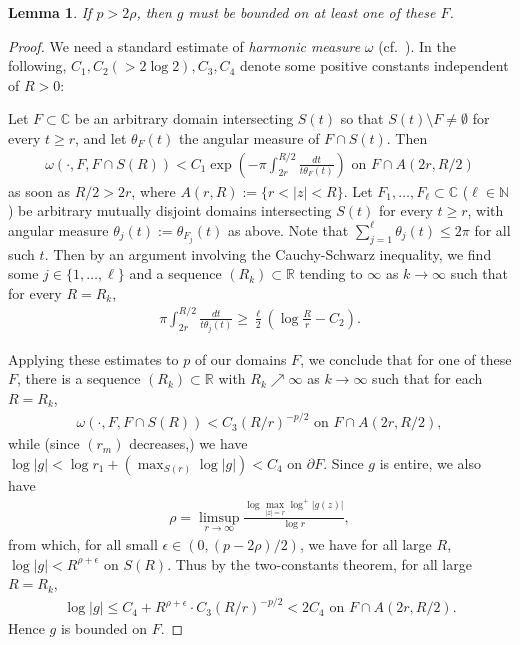 \documentclass[a4paper,12pt]{amsart}
\theoremstyle{plain}
\newtheorem{lemma}[equation]{Lemma}
\theoremstyle{definition}
\theoremstyle{remark}
\numberwithin{equation}{section}
\begin{document}
\begin{lemma}\label{th:setF}
 If $p>2\rho$, then $g$ must be bounded on at least one of these $F$.
\end{lemma}

\begin{proof}
We need a standard estimate of {\itshape harmonic measure} $\omega$
(cf.\ \cite[XI. \S 4]{Nevan70}).
In the following,
$C_1,C_2(>2\log 2),C_3,C_4$ denote some positive constants independent of $R>0$:

Let $F\subset{\mathbb{C}}$ be an arbitrary domain intersecting $S(t)$ 
so that $S(t)\setminus F\neq \emptyset$ for every $t\ge r$,
and let $\theta_F(t)$ the angular measure of $F\cap S(t)$. Then
 \begin{gather*}
  \omega(\cdot,F,F\cap S(R))<C_1\exp\left(-\pi\int_{2r}^{R/2}\frac{{\mathit{d}} t}{t\theta_F(t)}\right)\text{ on } F\cap A(2r,R/2)\label{eq:tsuji}
 \end{gather*}
as soon as $R/2>2r$, where $A(r,R):=\{r<|z|<R\}$. Let $F_1,\ldots, F_\ell\subset{\mathbb{C}}$
($\ell\in{\mathbb{N}}$) be arbitrary mutually disjoint domains intersecting $S(t)$
for every $t\ge r$, with angular measure $\theta_j(t):=\theta_{F_j}(t)$ as above.
Note that $\sum_{j=1}^{\ell}\theta_j(t)\le 2\pi$ for all such $t$.
Then by an argument involving the Cauchy-Schwarz inequality,
we find some $j\in\{1,\ldots,\ell\}$
and a sequence $(R_k)\subset{\mathbb{R}}$ tending to $\infty$ as $k\to\infty$
such that for every $R=R_k$,
\begin{gather*}
 \pi\int_{2r}^{R/2}\frac{{\mathit{d}} t}{t\theta_j(t)}\ge
 \frac{\ell}{2}\left(\log\frac{R}{r}-C_2\right).\label{eq:harm}
\end{gather*}

Applying these estimates to $p$ of our domains $F$,
we conclude that for one of these $F$, 
there is a sequence $(R_k)\subset{\mathbb{R}}$ with $R_k\nearrow\infty$ as $k\to\infty$
such that for each $R=R_k$,
\begin{gather*}
 \omega(\cdot,F,F\cap S(R))<C_3(R/r)^{-p/2}\text{ on }F\cap A(2r,R/2),
\end{gather*}
while (since $(r_m)$ decreases,) 
we have $\log |g|<\log r_1+(\max_{S(r)}\log|g|)<C_4$ on $\partial F$.
Since $g$ is entire, we also have
\begin{gather*}
 \rho=\limsup_{r\to\infty}\frac{\log\max_{|z|=r}\log^+|g(z)|}{\log r},\label{eq:orderentire}
\end{gather*}
from which, for all small $\epsilon\in(0,(p-2\rho)/2)$,
we have for all large $R$, $\log|g|<R^{\rho+\epsilon}$ on $S(R)$.
Thus by the two-constants theorem, for all large $R=R_k$,
\begin{gather*}
 \log|g|\le C_4+R^{\rho+\epsilon}\cdot C_3(R/r)^{-p/2}<2C_4\text{ on }F\cap A(2r,R/2).
\end{gather*}
Hence $g$ is bounded on $F$.
\end{proof}
\end{document}
